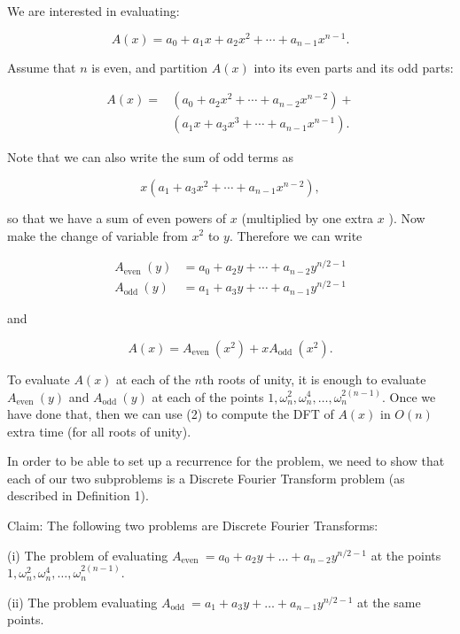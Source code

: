 We are interested in evaluating:

$$
A(x)=a_{0}+a_{1} x+a_{2} x^{2}+\cdots+a_{n-1} x^{n-1} .
$$

Assume that $n$ is even, and partition $A(x)$ into its even parts and its odd parts:

$$
\begin{aligned}
A(x)= & \left(a_{0}+a_{2} x^{2}+\cdots+a_{n-2} x^{n-2}\right)+ \\
& \left(a_{1} x+a_{3} x^{3}+\cdots+a_{n-1} x^{n-1}\right) .
\end{aligned}
$$

Note that we can also write the sum of odd terms as

$$
x\left(a_{1}+a_{3} x^{2}+\cdots+a_{n-1} x^{n-2}\right),
$$

so that we have a sum of even powers of $x$ (multiplied by one extra $x$ ). Now make the change of variable from $x^{2}$ to $y$. Therefore we can write

$$
\begin{aligned}
A_{\text {even }}(y) & =a_{0}+a_{2} y+\cdots+a_{n-2} y^{n / 2-1} \\
A_{\text {odd }}(y) & =a_{1}+a_{3} y+\cdots+a_{n-1} y^{n / 2-1}
\end{aligned}
$$

and


\begin{equation*}
A(x)=A_{\text {even }}\left(x^{2}\right)+x A_{\text {odd }}\left(x^{2}\right) . \tag{2}
\end{equation*}


To evaluate $A(x)$ at each of the $n$th roots of unity, it is enough to evaluate $A_{\text {even }}(y)$ and $A_{\text {odd }}(y)$ at each of the points $1, \omega_{n}^{2}, \omega_{n}^{4}, \ldots, \omega_{n}^{2(n-1)}$. Once we have done that, then we can use (2) to compute the DFT of $A(x)$ in $O(n)$ extra time (for all roots of unity).

In order to be able to set up a recurrence for the problem, we need to show that each of our two subproblems is a Discrete Fourier Transform problem (as described in Definition 1).

Claim: The following two problems are Discrete Fourier Transforms:

(i) The problem of evaluating $A_{\text {even }}=a_{0}+a_{2} y+\ldots+a_{n-2} y^{n / 2-1}$ at the points $1, \omega_{n}^{2}, \omega_{n}^{4}, \ldots, \omega_{n}^{2(n-1)}$.

(ii) The problem evaluating $A_{\text {odd }}=a_{1}+a_{3} y+\ldots+a_{n-1} y^{n / 2-1}$ at the same points.

